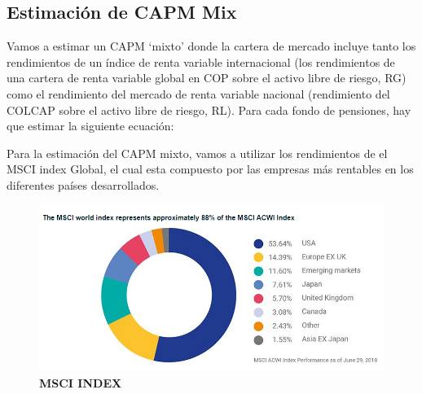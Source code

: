 \documentclass[
  12pt,
]{article}
\newenvironment{Shaded}{\begin{snugshade}}{\end{snugshade}}
\newcommand{\AttributeTok}[1]{\textcolor[rgb]{0.77,0.63,0.00}{#1}}
\newcommand{\DecValTok}[1]{\textcolor[rgb]{0.00,0.00,0.81}{#1}}
\newcommand{\FunctionTok}[1]{\textcolor[rgb]{0.00,0.00,0.00}{#1}}
\newcommand{\NormalTok}[1]{#1}
\newcommand{\OtherTok}[1]{\textcolor[rgb]{0.56,0.35,0.01}{#1}}
\newcommand{\SpecialCharTok}[1]{\textcolor[rgb]{0.00,0.00,0.00}{#1}}
\newcommand{\StringTok}[1]{\textcolor[rgb]{0.31,0.60,0.02}{#1}}
\begin{document}
\begin{Shaded}
\end{Shaded}

\hypertarget{estimaciuxf3n-de-capm-mix}{%
\subsection{Estimación de CAPM Mix}\label{estimaciuxf3n-de-capm-mix}}

Vamos a estimar un CAPM `mixto' donde la cartera de mercado incluye
tanto los rendimientos de un índice de renta variable internacional (los
rendimientos de una cartera de renta variable global en COP sobre el
activo libre de riesgo, RG) como el rendimiento del mercado de renta
variable nacional (rendimiento del COLCAP sobre el activo libre de
riesgo, RL). Para cada fondo de pensiones, hay que estimar la siguiente
ecuación:

Para la estimación del CAPM mixto, vamos a utilizar los rendimientos de
el MSCI index Global, el cual esta compuesto por las empresas más
rentables en los diferentes países desarrollados.

\begin{figure}
\centering
\includegraphics{index.png}
\caption{\textbf{MSCI INDEX}}
\end{figure}
\end{document}
